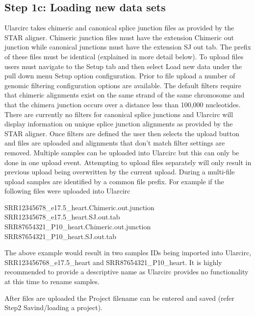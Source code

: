 \documentclass[12pt]{article}
\begin{document}
\subsection{Step 1c: Loading new data sets} \label{sec:Step1c}
Ularcirc takes chimeric and canonical splice junction files as provided by the STAR aligner. Chimeric junction files must have the extension Chimeric out junction while canonical junctions must have the extension SJ out tab. The prefix of these files must be identical (explained in more detail below). To upload files users must navigate to the Setup tab and then select Load new data under the pull down menu Setup option configuration. Prior to file upload a number of genomic filtering configuration options are available. The default filters require that chimeric alignments exist on the same strand of the same chromosome and that the chimera junction occurs over a distance less than 100,000 nucleotides.  There are currently no filters for canonical splice junctions and Ularcirc will display information on unique splice junction alignments as provided by the STAR aligner. Once filters are defined the user then selects the upload button and files are uploaded and alignments that don’t match filter settings are removed.
\indent Multiple samples can be uploaded into Ularcirc but this can only be done in one upload event. Attempting to upload files separately will only result in previous upload being overwritten by the current upload. During a multi-file upload samples are identified by a common file prefix.  For example if the following files were uploaded into Ularcirc

\noindent
\begin{mdframed}
SRR12345678\_e17.5\_heart.Chimeric.out.junction \\
SRR12345678\_e17.5\_heart.SJ.out.tab            \\
SRR87654321\_P10\_heart.Chimeric.out.junction   \\
SRR87654321\_P10\_heart.SJ.out.tab
\end{mdframed}


The above example would result in two samples IDs being imported into Ularcirc, SRR123456768\_e17.5\_heart and SRR87654321\_P10\_heart. It is highly recommended to provide a descriptive name as Ularcirc provides no functionality at this time to rename samples.

After files are uploaded the Project filename can be entered and saved (refer Step2 Savind/loading a project).


\end{document}
